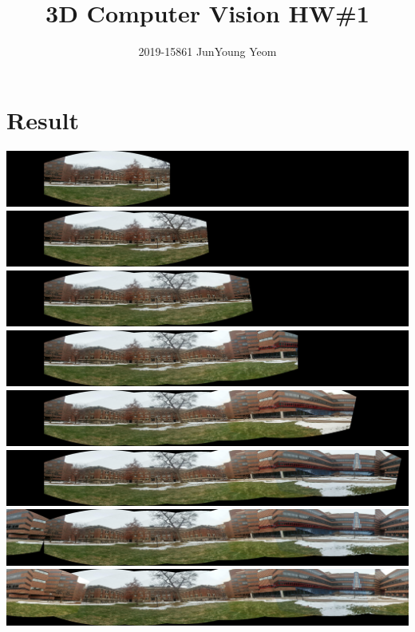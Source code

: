 \documentclass{article}
\title{3D Computer Vision HW\#1}
\author{2019-15861 JunYoung Yeom}
\begin{document}
\maketitle
\section{Result}
\includegraphics{output_1.png}
\includegraphics{output_2.png}
\includegraphics{output_3.png}
\includegraphics{output_4.png}
\includegraphics{output_5.png}
\includegraphics{output_6.png}
\includegraphics{output_7.png}
\includegraphics{output_8.png}
\end{document}
